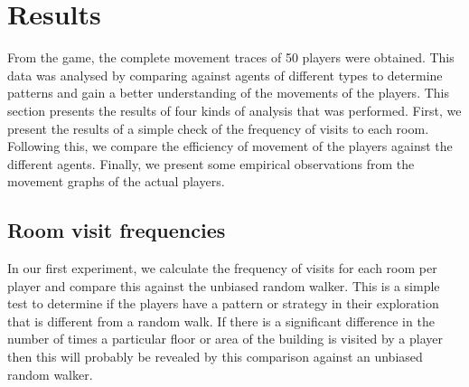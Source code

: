 
\section{Results} %
\label{sec:analysis_of_experiment_results}



From the game, the complete movement traces of 50 players were obtained. This data was analysed by comparing against agents of different types to determine patterns and gain a better understanding of the movements of the players. This section presents the results of four kinds of analysis that was performed. First, we present the results of a simple check of the frequency of visits to each room. Following this, we compare the efficiency of movement of the players against the different agents. Finally, we present some empirical observations from the movement graphs of the actual players.


\subsection{Room visit frequencies}


In our first experiment, we calculate the frequency of visits for each room per player and compare this against the unbiased random walker. This is a simple test to determine if the players have a pattern or strategy in their exploration that is different from a random walk. If there is a significant difference in the number of times a particular floor or area of the building is visited by a player then this will probably be revealed by this comparison against an unbiased random walker.

